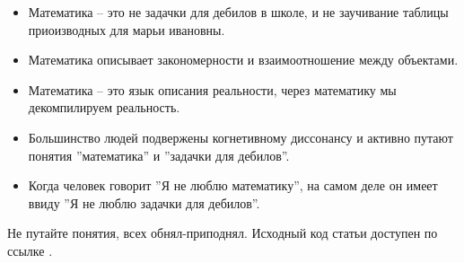 \begin{itemize}
    \item Математика -- это не задачки для дебилов в школе, и не заучивание таблицы приоизводных для марьи ивановны.
    \item Математика описывает закономерности и взаимоотношение между объектами.
    \item Математика -- это язык описания реальности, через математику мы декомпилируем реальность.
    \item Большинство людей подвержены когнетивному диссонансу и активно путают понятия ''математика'' и ''задачки для дебилов''.
    \item Когда человек говорит ''Я не люблю математику'', на самом деле он имеет ввиду ''Я не люблю задачки для дебилов''.
\end{itemize}
Не путайте понятия, всех обнял-приподнял.
Исходный код статьи доступен по ссылке \cite{MathIsNecessary_2022}.